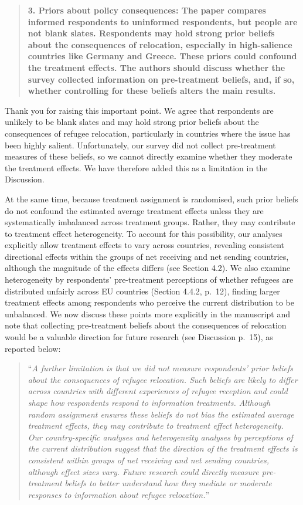 \documentclass[
  11pt,
]{article}
\begin{document}
\begin{quote}
\textbf{3. Priors about policy consequences: The paper compares informed respondents to uninformed respondents, but people are not blank slates. Respondents may hold strong prior beliefs about the consequences of relocation, especially in high-salience countries like Germany and Greece. These priors could confound the treatment effects. The authors should discuss whether the survey collected information on pre-treatment beliefs, and, if so, whether controlling for these beliefs alters the main results.}
\end{quote}

Thank you for raising this important point. We agree that respondents are unlikely to be blank slates and may hold strong prior beliefs about the consequences of refugee relocation, particularly in countries where the issue has been highly salient. Unfortunately, our survey did not collect pre-treatment measures of these beliefs, so we cannot directly examine whether they moderate the treatment effects. We have therefore added this as a limitation in the Discussion.

At the same time, because treatment assignment is randomised, such prior beliefs do not confound the estimated average treatment effects unless they are systematically imbalanced across treatment groups. Rather, they may contribute to treatment effect heterogeneity. To account for this possibility, our analyses explicitly allow treatment effects to vary across countries, revealing consistent directional effects within the groups of net receiving and net sending countries, although the magnitude of the effects differs (see Section 4.2). We also examine heterogeneity by respondents' pre-treatment perceptions of whether refugees are distributed unfairly across EU countries (Section 4.4.2, p.~12), finding larger treatment effects among respondents who perceive the current distribution to be unbalanced. We now discuss these points more explicitly in the manuscript and note that collecting pre-treatment beliefs about the consequences of relocation would be a valuable direction for future research (see Discussion p.~15), as reported below:

\begin{quote}
``\emph{A further limitation is that we did not measure respondents' prior beliefs about the consequences of refugee relocation. Such beliefs are likely to differ across countries with different experiences of refugee reception and could shape how respondents respond to information treatments. Although random assignment ensures these beliefs do not bias the estimated average treatment effects, they may contribute to treatment effect heterogeneity. Our country-specific analyses and heterogeneity analyses by perceptions of the current distribution suggest that the direction of the treatment effects is consistent within groups of net receiving and net sending countries, although effect sizes vary. Future research could directly measure pre-treatment beliefs to better understand how they mediate or moderate responses to information about refugee relocation.}''
\end{quote}
\end{document}
